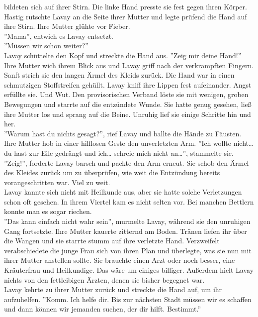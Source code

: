 bildeten sich auf ihrer Stirn. Die linke Hand presste sie fest gegen ihren Körper. Hastig rutschte 
Lavay an die Seite ihrer Mutter und legte prüfend die Hand auf ihre Stirn. Ihre Mutter glühte vor 
Fieber.\\
''Mama'', entwich es Lavay entsetzt.\\
''Müssen wir schon weiter?''\\
Lavay schüttelte den Kopf und streckte die Hand aus. ''Zeig mir deine Hand!''\\
Ihre Mutter wich ihrem Blick aus und Lavay griff nach der verkrampften Fingern. Sanft strich sie 
den langen Ärmel des Kleids zurück. Die Hand war in einen schmutzigen Stoffstreifen gehüllt. Lavay 
kniff ihre Lippen fest aufeinander. Angst erfüllte sie. Und Wut. Den provisorischen Verband löste 
sie mit wenigen, groben Bewegungen und starrte auf die entzündete Wunde. Sie hatte genug gesehen, 
ließ ihre Mutter los und sprang auf die Beine. Unruhig lief sie einige Schritte hin und her.\\
''Warum hast du nichts gesagt?'', rief Lavay und ballte die Hände zu Fäusten. \\
Ihre Mutter hob in einer hilflosen Geste den unverletzten Arm. ''Ich wollte nicht… du hast zur Eile 
gedrängt und ich… schreie mich nicht an…'', stammelte sie.\\
''Zeig!'', forderte Lavay barsch und packte den Arm erneut. Sie schob den Ärmel des Kleides zurück 
um zu überprüfen, wie weit die Entzündung bereits vorangeschritten war. Viel zu weit.\\
Lavay kannte sich nicht mit Heilkunde aus, aber sie hatte solche Verletzungen schon oft gesehen. In 
ihrem Viertel kam es nicht selten vor. Bei manchen Bettlern konnte man es sogar riechen.\\
''Das kann einfach nicht wahr sein'', murmelte Lavay, während sie den unruhigen Gang fortsetzte.
Ihre Mutter kauerte zitternd am Boden. Tränen liefen ihr über die Wangen und sie starrte stumm auf 
ihre verletzte Hand. Verzweifelt verabschiedete die junge Frau sich von ihren Plan und überlegte, 
was sie nun mit ihrer Mutter anstellen sollte. Sie brauchte einen Arzt oder noch besser, eine 
Kräuterfrau und Heilkundige. Das wäre um einiges billiger. Außerdem hielt Lavay nichts von den 
fettleibigen Ärzten, denen sie bisher begegnet war.\\ 
Lavay kehrte zu ihrer Mutter zurück und streckte die Hand auf, um ihr aufzuhelfen. 
''Komm. Ich helfe dir. Bis zur nächsten Stadt müssen wir es schaffen und dann können wir jemanden 
suchen, der dir hilft. Bestimmt.''\\
